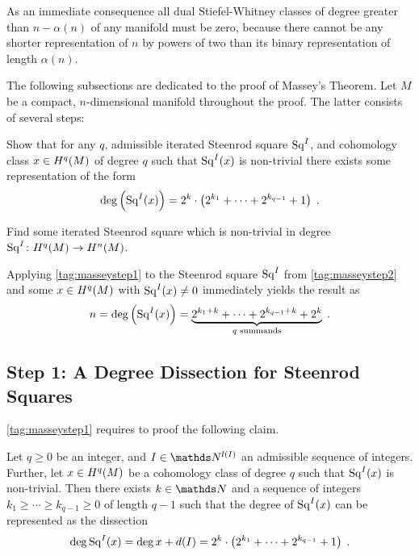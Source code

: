 As an immediate consequence all dual Stiefel-Whitney classes of degree
greater than $n-\alpha(n)$ of any manifold must be zero,
because there cannot be any shorter representation of $n$ by powers of
two than its binary representation of length $\alpha(n)$.

The following subsections are dedicated to the proof of Massey's Theorem.
Let $M$ be a compact, $n$-dimensional manifold throughout the proof.
The latter consists of several steps:
\begin{steps}
\item\label{tag:masseystep1} 
  Show that for any $q$, admissible iterated Steenrod square $\mathrm{Sq}^{I}$, and cohomology
  class $x\in H^q(M)$ of degree $q$ such that $\mathrm{Sq}^{I}(x)$ is non-trivial there exists
  some representation of the form
  \begin{gather*}
    \deg \left(\mathrm{Sq}^{I}(x)\right)
    = 2^k\cdot
    \left( 2^{k_1}+\dotsb+2^{k_{q-1}} + 1 \right)
    \;.
  \end{gather*}
\item\label{tag:masseystep2}
  Find some iterated Steenrod square which is non-trivial in degree
  $\mathrm{Sq}^{I}\colon H^q(M)\to H^n(M)$.
\end{steps}
Applying \ref{tag:masseystep1} to the Steenrod square $\mathrm{Sq}^{I}$ from
\ref{tag:masseystep2} and some $x\in H^q(M)$ with $\mathrm{Sq}^{I}(x)\neq 0$
immediately yields the result as
\begin{gather*}
  n = \deg\left(\mathrm{Sq}^{I}(x)\right) = \underbrace
  {2^{k_1+k}+\dotsb+2^{k_{q-1}+k} + 2^{k}}_{\text{$q$ summands}}
  \;.
\end{gather*}

\subsection[Degree Dissection for Steenrod Squares]
{Step 1: A Degree Dissection for Steenrod Squares}
\ref{tag:masseystep1} requires to proof the following claim.
\begin{Lem}[\ref{tag:masseystep1}]\label{lem:masseystep1}
  Let $q\geq 0$ be an integer,
  and $I\in\Nat^{\l(I)}$ an admissible sequence of integers.
  Further, let $x\in H^q(M)$ be a cohomology class of degree $q$
  such that $\mathrm{Sq}^{I}(x)$ is non-trivial.
  Then there exists $k\in\Nat$ and a sequence of integers
  $k_1\geq\dotsb\geq k_{q-1}\geq0$ of length $q-1$ such that the
  degree of $\mathrm{Sq}^{I}(x)$ can be represented as the dissection
  \begin{gather*}
    \deg \mathrm{Sq}^{I}(x)
    = \deg x + d(I)
    = 2^k\cdot
    \left( 2^{k_1}+\dotsb+2^{k_{q-1}} + 1 \right)
    \;.
  \end{gather*}
\end{Lem}

